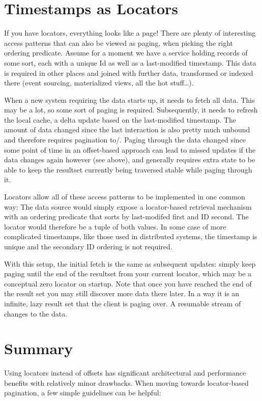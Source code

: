 \documentclass[11pt,a4paper]{article}
\begin{document}
\begin{multicols*}{2}
\section*{Timestamps as Locators}
If you have locators, everything looks like a page! There are plenty of
interesting access patterns that can also be viewed as paging, when picking the
right ordering predicate. Assume for a moment we have a service holding records
of some sort, each with a unique Id as well as a last-modified timestamp. This
data is required in other places and joined with further data, transformed or
indexed there (event sourcing, materialized views, all the hot stuff\ldots). 

When a new system
requiring the data starts up, it needs to fetch all data. This may be a lot, so
some sort of paging is required. Subsequently, it needs to refresh the local
cache, a delta update based on the last-modified timestamp. The amount of data
changed since the last interaction is also pretty much unbound and therefore
requires pagination to/. Paging through the data changed since some point of time
in an offset-based approach can lead to missed updates if the data changes again
however (see above), and generally requires extra state to be able to keep the
resultset currently being traversed stable while paging through it. 

Locators allow all of these access patterns to be implemented in one common way:
The data source would simply expose a locator-based retrieval mechanism with an
ordering predicate that sorts by last-modifed first and ID second. The locator 
would therefore be a tuple of both values. In some case of more complicated
timestamps, like those used in distributed systems, the timestamp is unique and
the secondary ID ordering is not required. 

With this setup, the initial fetch is the same as subsequent updates: simply
keep paging until the end of the resultset from your current locator, which may
be a conceptual zero locator on startup. Note that once you have reached the end
of the result set you may still discover more data there later. In a way it is
an infinite, lazy result set that the client is paging over. A resumable stream
of changes to the data.

\section*{Summary}

Using locators instead of offsets has significant architectural and performance
benefits with relatively minor drawbacks. When moving towards locator-based
pagination, a few simple guidelines can be helpful:


\end{multicols*}
\end{document}
